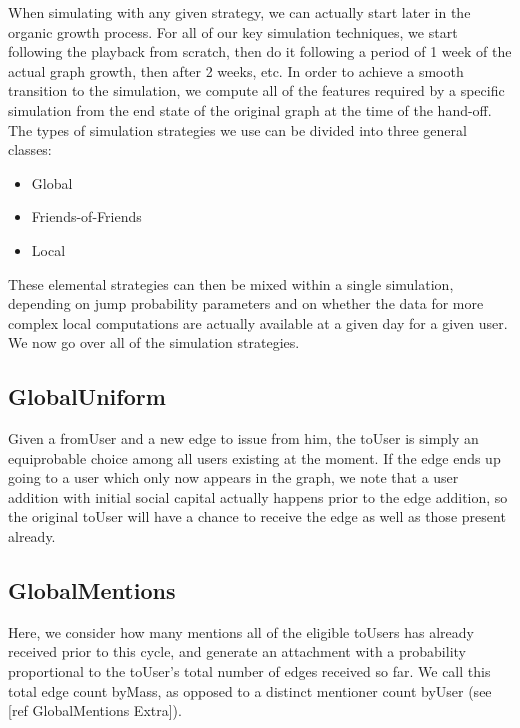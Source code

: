 \documentclass[10pt,oneside]{memoir}
\begin{document}
When simulating with any given strategy, we can actually start later in the organic growth process.  For all of our key simulation techniques, we start following the playback from scratch, then do it following a period of 1 week of the actual graph growth, then after 2 weeks, etc.  In order to achieve a smooth transition to the simulation, we compute all of the features required by a specific simulation from the end state of the original graph at the time of the hand-off.
The types of simulation strategies we use can be divided into three general classes:


\begin{itemize}


\item Global

\item Friends-of-Friends

\item Local
\end{itemize}

These elemental strategies can then be mixed within a single simulation, depending on jump probability parameters and on whether the data for more complex local computations are actually available at a given day for a given user.  We now go over all of the simulation strategies.


\subsection{GlobalUniform}
\label{globaluniform}

Given a fromUser and a new edge to issue from him, the toUser is simply an equiprobable choice among all users existing at the moment.  If the edge ends up going to a user which only now appears in the graph, we note that a user addition with initial social capital actually happens prior to the edge addition, so the original toUser will have a chance to receive the edge as well as those present already.


\subsection{GlobalMentions}
\label{globalmentions}

Here, we consider how many mentions all of the eligible toUsers has already received prior to this cycle, and generate an attachment with a probability proportional to the toUser's total number of edges received so far. We call this total edge count byMass, as opposed to a distinct mentioner count byUser (see [ref GlobalMentions Extra]).
\end{document}
